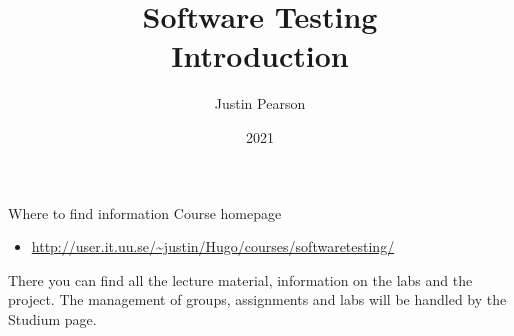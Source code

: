 \documentclass{beamer}
\title{Software Testing \\ Introduction}
\author{Justin Pearson}
\date{2021}
\begin{document}
\lstset{language=python}

\begin{frame}
  \maketitle
\end{frame}
\begin{frame}{Where to find information}
Course homepage
 \begin{itemize}
 \item \url{http://user.it.uu.se/~justin/Hugo/courses/softwaretesting/}
 \end{itemize}
 There you can find all the lecture material, information on the labs
 and the project. The management of groups, assignments and labs will
 be handled by the Studium page.  
\end{frame}
\end{document}
